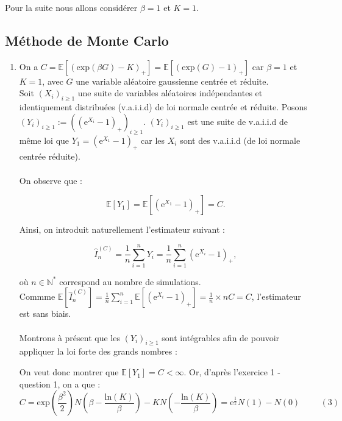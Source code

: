 \documentclass{article}
\theoremstyle{exostyle}
\newenvironment{questions}{
\begin{enumerate}[\hspace{12pt} 1.]}{\end{enumerate}}
\begin{document}
\bigbreak
\bigbreak
\bigbreak

\hspace{-0.51cm}Pour la suite nous allons considérer $\beta = 1$ et $K = 1$.

\bigbreak

\subsection{Méthode de Monte Carlo}

\begin{questions}

\bigbreak

\item On a $C = \mathbb{E}[(\text{exp}(\beta G)-K)_{+}] =\mathbb{E}[(\text{exp}(G)-1)_{+}]$ car $\beta = 1$ et $K = 1$, avec $G$ une variable aléatoire gaussienne centrée et réduite.\\
Soit $(X_{i})_{i \geq 1}$ une suite de variables aléatoires indépendantes et identiquement distribuées (v.a.i.i.d) de loi normale centrée et réduite. Posons $(Y_{i})_{i \geq 1} := \left(\left(\text{e}^{X_{i}}-1\right)_{+}\right)_{i \geq 1}$.
$(Y_{i})_{i \geq 1}$ est une suite de v.a.i.i.d de même loi que $Y_{1} = \left( \text{e}^{X_{1}}-1 \right)_{+}$ car les $X_{i}$ sont des v.a.i.i.d (de loi normale centrée réduite).\\
\\

On observe que : 

\[\mathbb{E} [Y_{1}] = \mathbb{E} \left[ \left(\text{e}^{X_{1}} - 1 \right)_{+} \right] = C.\]

Ainsi, on introduit naturellement l'estimateur suivant :

\[\hat{I}_{n}^{(C)} = \frac{1}{n} \sum_{i=1}^{n} Y_{i} = \frac{1}{n} \sum_{i=1}^{n} \left( \text{e}^{X_{i}} - 1 \right)_{+},\]

où $n \in \mathbb{N}^{*}$ correspond au nombre de simulations.\\

Commme $\mathbb{E} [\hat{I}_{n}^{(C)}] = \frac{1}{n} \sum_{i=1}^{n} \mathbb{E} \left[ \left(\text{e}^{X_{i}} - 1 \right)_{+}\right] = \frac{1}{n} \times nC = C$, l'estimateur est sans biais.\\
\\

Montrons à présent que les $(Y_{i})_{i \geq 1}$ sont intégrables afin de pouvoir appliquer la loi forte des grands nombres :

On veut donc montrer que $\mathbb{E}[Y_{1}] = C < \infty$. Or, d'après l'exercice 1 - question 1, on a que :
\[C = \text{exp}\left( \frac{\beta^{2}}{2}\right)N\left( \beta - \frac{\text{ln}(K)}{\beta}\right) -KN \left( -\frac{\text{ln}(K)}{\beta} \right) = \text{e}^{\frac{1}{2}} N(1) - N(0) \hspace{1cm} (3)\]


\end{questions}
\end{document}
